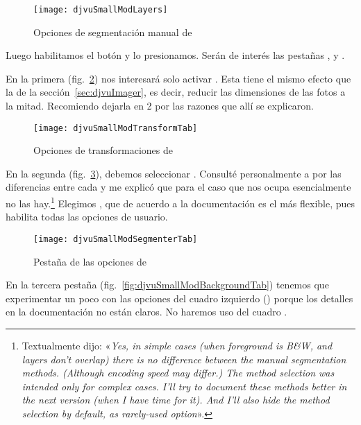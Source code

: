 \documentclass[%
	a5paper,
	10pt,
	twoside,
	openright,
	final,
]{memoir}
\begin{document}
	\begin{figure}
		\texttt{[image: djvuSmallModLayers]}
		\caption{Opciones de segmentación manual de \djvusmallmod\label{fig:djvuSmallModLayers}}
	\end{figure}

	Luego habilitamos el botón  y lo presionamos. Serán de interés las pestañas ,  y .

	En la primera (fig.~\ref{fig:djvuSmallModTransformTab}) nos interesará solo activar . Esta tiene el mismo efecto que la  de la sección~\ref{sec:djvuImager}, es decir, reducir las dimensiones de las fotos a la mitad. Recomiendo dejarla en 2 por las razones que allí se explicaron.

	\begin{figure}
		\texttt{[image: djvuSmallModTransformTab]}
		\caption{Opciones de transformaciones de \djvusmallmod\label{fig:djvuSmallModTransformTab}}
	\end{figure}

	En la segunda (fig.~\ref{fig:djvuSmallModSegmenterTab}), debemos seleccionar . Consulté personalmente a \textsharik por las diferencias entre cada  y me explicó que para el caso que nos ocupa esencialmente no las hay.\footnote{Textualmente dijo: «\emph{Yes, in simple cases (when foreground is B\&W, and layers don't overlap) there is no difference between the manual segmentation methods. (Although encoding speed may differ.) The method selection was intended only for complex cases. I'll try to document these methods better in the next version (when I have time for it). And I'll also hide the method selection by default, as rarely-used option}».} Elegimos , que de acuerdo a la documentación es el más flexible, pues habilita todas las opciones de usuario.

	\begin{figure}
		\texttt{[image: djvuSmallModSegmenterTab]}
		\caption[]{Pestaña  de las opciones de \djvusmallmod\label{fig:djvuSmallModSegmenterTab}}
	\end{figure}

	En la tercera pestaña (fig.~\ref{fig:djvuSmallModBackgroundTab}) tenemos que experimentar un poco con las opciones del cuadro izquierdo () porque los detalles en la documentación no están claros. No haremos uso del cuadro .
\end{document}
